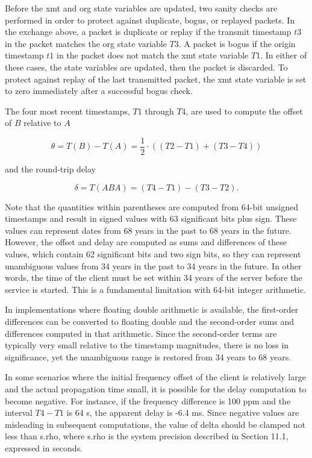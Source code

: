 Before the xmt and org state variables are updated, two sanity checks
are performed in order to protect against duplicate, bogus, or
replayed packets. In the exchange above, a packet is duplicate or
replay if the transmit timestamp $ t3 $ in the packet matches the org
state variable $ T3 $. A packet is bogus if the origin timestamp $ t1 $ in
the packet does not match the xmt state variable $ T1 $. In either of
these cases, the state variables are updated, then the packet is
discarded. To protect against replay of the last transmitted packet,
the xmt state variable is set to zero immediately after a successful
bogus check.

The four most recent timestamps, $ T1 $ through $ T4 $, are used to compute
the offset of $ B $ relative to $ A $

$$
\theta = T(B) - T(A) = \frac{1}{2} \cdot ((T2 - T1) + (T3 - T4))
$$

and the round-trip delay

$$
\delta = T(ABA) = (T4 - T1) - (T3 - T2).
$$

Note that the quantities within parentheses are computed from 64-bit
unsigned timestamps and result in signed values with 63 significant
bits plus sign. These values can represent dates from 68 years in
the past to 68 years in the future. However, the offset and delay
are computed as sums and differences of these values, which contain
62 significant bits and two sign bits, so they can represent
unambiguous values from 34 years in the past to 34 years in the
future. In other words, the time of the client must be set within 34
years of the server before the service is started. This is a
fundamental limitation with 64-bit integer arithmetic.

In implementations where floating double arithmetic is available, the
first-order differences can be converted to floating double and the
second-order sums and differences computed in that arithmetic. Since
the second-order terms are typically very small relative to the
timestamp magnitudes, there is no loss in significance, yet the
unambiguous range is restored from 34 years to 68 years.

In some scenarios where the initial frequency offset of the client is
relatively large and the actual propagation time small, it is
possible for the delay computation to become negative. For instance,
if the frequency difference is 100 ppm and the interval $ T4 - T1 $ is 64
s, the apparent delay is -6.4 ms. Since negative values are
misleading in subsequent computations, the value of delta should be
clamped not less than s.rho, where s.rho is the system precision
described in Section 11.1, expressed in seconds.

